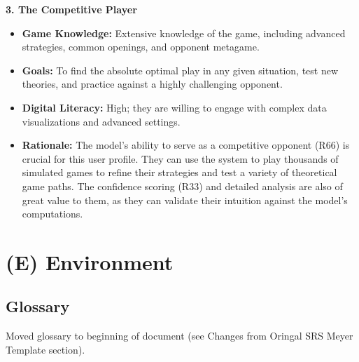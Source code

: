 \documentclass{article}
\begin{document}
\noindent\textbf{3. The Competitive Player}
\begin{itemize}
    \item \textbf{Game Knowledge:} Extensive knowledge of the game, including advanced strategies, common openings, and opponent metagame.
    \item \textbf{Goals:} To find the absolute optimal play in any given situation, test new theories, and practice against a highly challenging opponent.
    \item \textbf{Digital Literacy:} High; they are willing to engage with complex data visualizations and advanced settings.
    \item \textbf{Rationale:} The \AI{} model's ability to serve as a competitive opponent (R66) is crucial for this user profile. They can use the system to play thousands of simulated games to refine their strategies and test a variety of theoretical game paths. The confidence scoring (R33) and detailed analysis are also of great value to them, as they can validate their intuition against the model's computations.
\end{itemize}


\newpage{}



\section*{(E) Environment}\label{sec:srs-environment}
\renewcommand{\thesubsection}{E.\arabic{subsection}}
\setcounter{subsection}{0}

\subsection{Glossary}\label{subsec:glossary}
\raggedright Moved glossary to beginning of document (see Changes from Oringal SRS Meyer Template section).
\end{document}
